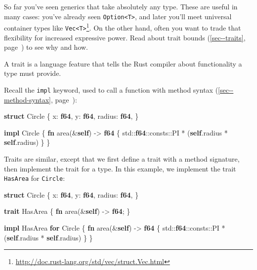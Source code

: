 \documentclass[a4paper,]{book}
\renewcommand*{\hyperref}[2][\ar]{%
  \def\ar{#2}%
  #2 (\autoref{#1}, page~\pageref{#1})}
\newenvironment{Shaded}{\begin{snugshade}}{\end{snugshade}}
\newcommand{\KeywordTok}[1]{\textcolor[rgb]{0.13,0.29,0.53}{\textbf{{#1}}}}
\newcommand{\NormalTok}[1]{{#1}}
\renewcommand{\href}[2]{#2\footnote{\url{#1}}}
\begin{document}
So far you've seen generics that take absolutely any type. These are
useful in many cases: you've already seen
\texttt{Option\textless{}T\textgreater{}}, and later you'll meet
universal container types like
\href{http://doc.rust-lang.org/std/vec/struct.Vec.html}{\texttt{Vec\textless{}T\textgreater{}}}.
On the other hand, often you want to trade that flexibility for
increased expressive power. Read about \hyperref[sec--traits]{trait
bounds} to see why and how.


A trait is a language feature that tells the Rust compiler about
functionality a type must provide.

Recall the \texttt{impl} keyword, used to call a function with
\hyperref[sec--method-syntax]{method syntax}:

\begin{Shaded}
\begin{Highlighting}[]
\KeywordTok{struct} \NormalTok{Circle \{}
    \NormalTok{x: }\KeywordTok{f64}\NormalTok{,}
    \NormalTok{y: }\KeywordTok{f64}\NormalTok{,}
    \NormalTok{radius: }\KeywordTok{f64}\NormalTok{,}
\NormalTok{\}}

\KeywordTok{impl} \NormalTok{Circle \{}
    \KeywordTok{fn} \NormalTok{area(&}\KeywordTok{self}\NormalTok{) -> }\KeywordTok{f64} \NormalTok{\{}
        \NormalTok{std::}\KeywordTok{f64}\NormalTok{::consts::PI * (}\KeywordTok{self}\NormalTok{.radius * }\KeywordTok{self}\NormalTok{.radius)}
    \NormalTok{\}}
\NormalTok{\}}
\end{Highlighting}
\end{Shaded}

Traits are similar, except that we first define a trait with a method
signature, then implement the trait for a type. In this example, we
implement the trait \texttt{HasArea} for \texttt{Circle}:

\begin{Shaded}
\begin{Highlighting}[]
\KeywordTok{struct} \NormalTok{Circle \{}
    \NormalTok{x: }\KeywordTok{f64}\NormalTok{,}
    \NormalTok{y: }\KeywordTok{f64}\NormalTok{,}
    \NormalTok{radius: }\KeywordTok{f64}\NormalTok{,}
\NormalTok{\}}

\KeywordTok{trait} \NormalTok{HasArea \{}
    \KeywordTok{fn} \NormalTok{area(&}\KeywordTok{self}\NormalTok{) -> }\KeywordTok{f64}\NormalTok{;}
\NormalTok{\}}

\KeywordTok{impl} \NormalTok{HasArea }\KeywordTok{for} \NormalTok{Circle \{}
    \KeywordTok{fn} \NormalTok{area(&}\KeywordTok{self}\NormalTok{) -> }\KeywordTok{f64} \NormalTok{\{}
        \NormalTok{std::}\KeywordTok{f64}\NormalTok{::consts::PI * (}\KeywordTok{self}\NormalTok{.radius * }\KeywordTok{self}\NormalTok{.radius)}
    \NormalTok{\}}
\NormalTok{\}}
\end{Highlighting}
\end{Shaded}
\end{document}
